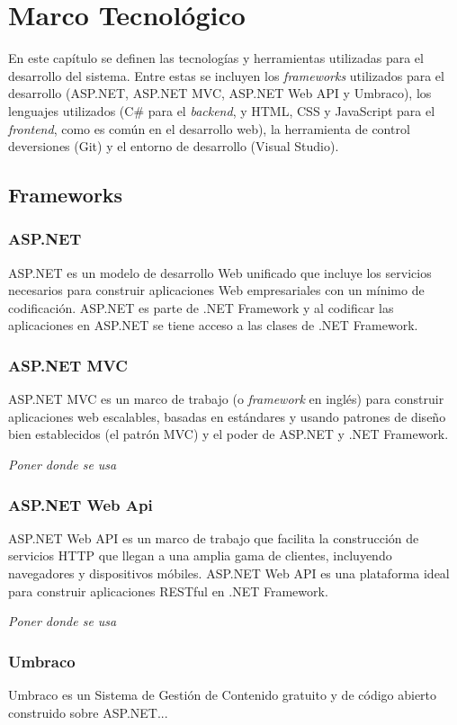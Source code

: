\chapter{Marco Tecnológico}
En este capítulo se definen las tecnologías y herramientas utilizadas para el desarrollo del sistema. Entre estas se incluyen los \textit{frameworks} utilizados para el desarrollo (ASP.NET, ASP.NET MVC, ASP.NET Web API y Umbraco), los lenguajes utilizados (C\# para el \textit{backend}, y HTML, CSS y JavaScript para el \textit{frontend}, como es común en el desarrollo web), la herramienta de control deversiones (Git) y el entorno de desarrollo (Visual Studio).

\section{Frameworks}
\subsection{ASP.NET}
ASP.NET es un modelo de desarrollo Web unificado que incluye los servicios necesarios para construir aplicaciones Web empresariales con un mínimo de codificación. ASP.NET es parte de .NET Framework y al codificar las aplicaciones en ASP.NET se tiene acceso a las clases de .NET Framework. \cite{asp.netMicrosoft}

\subsection{ASP.NET MVC}
ASP.NET MVC es un marco de trabajo (o \textit{framework} en inglés) para construir aplicaciones web escalables, basadas en estándares y usando patrones de diseño bien establecidos (el patrón MVC) y el poder de ASP.NET y .NET Framework. \cite{asp.netMVCMicrosoft}

\emph{Poner donde se usa}

\subsection{ASP.NET Web Api}
ASP.NET Web API es un marco de trabajo que facilita la construcción de servicios HTTP que llegan a una amplia gama de clientes, incluyendo navegadores y dispositivos móbiles. ASP.NET Web API es una plataforma ideal para construir aplicaciones RESTful en .NET Framework. \cite{asp.netWebAPIMicrosoft}

\emph{Poner donde se usa}

\subsection{Umbraco}
Umbraco es un Sistema de Gestión de Contenido gratuito y de código abierto construido sobre ASP.NET...

